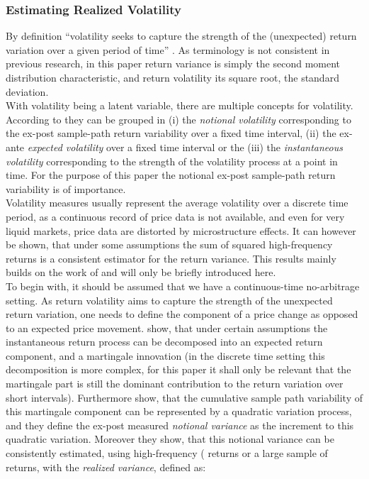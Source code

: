 \subsubsection{Estimating Realized Volatility}\label{sec:221RV}
By definition ``volatility seeks to capture the strength of the (unexpected) return variation over a given period of time'' \parencite[p.7]{andersen2001}. As terminology is not consistent in previous research, in this paper return variance is simply the second moment distribution characteristic, and return volatility its square root, the standard deviation. \\
With volatility being a latent variable, there are multiple concepts for volatility. According to \citeauthor{andersen2001} they can be grouped in (i) the \emph{notional volatility} corresponding to the ex-post sample-path return variability over a fixed time interval, (ii) the ex-ante \emph{expected volatility} over a fixed time interval or the (iii) the \emph{instantaneous volatility} corresponding to the strength of the volatility process at a point in time. For the purpose of this paper the notional ex-post sample-path return variability is of importance.\\
Volatility measures usually represent the average volatility over a discrete time period, as a continuous record of price data is not available, and even for very liquid markets, price data are distorted by microstructure effects. It can however be shown, that under some assumptions the sum of squared high-frequency returns is a consistent estimator for the return variance. This results mainly builds on the work of \textcite{andersen2001} and will only be briefly introduced here.\\
To begin with, it should be assumed that we have a continuous-time no-arbitrage setting. As return volatility aims to capture the strength of the unexpected return variation, one needs to define the component of a price change as opposed to an expected price movement. \textcite{andersen2001} show, that under certain assumptions the instantaneous return process can be decomposed into an expected return component, and a martingale innovation (in the discrete time setting this decomposition is more complex, for this paper it shall only be relevant that the martingale part is still the dominant contribution to the return variation over short intervals). Furthermore \textcite{andersen2001} show, that the cumulative sample path variability of this martingale component can be represented by a quadratic variation process, and they define the ex-post measured \emph{notional variance} as the increment to this quadratic variation. Moreover they show, that this notional variance can be consistently estimated, using high-frequency ( returns or a large sample of returns, with the \emph{realized variance}, defined as:
